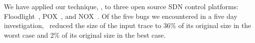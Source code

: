 We have applied our technique, \simulator, to three open source SDN control
platforms: Floodlight~\cite{bigswitch}, POX~\cite{pox}, and NOX~\cite{nox}.
Of the five bugs we encountered in a five day investigation,
\simulator~reduced the size of the input trace to 36\% of its original size in
the worst case and 2\% of its original size in the best case.



